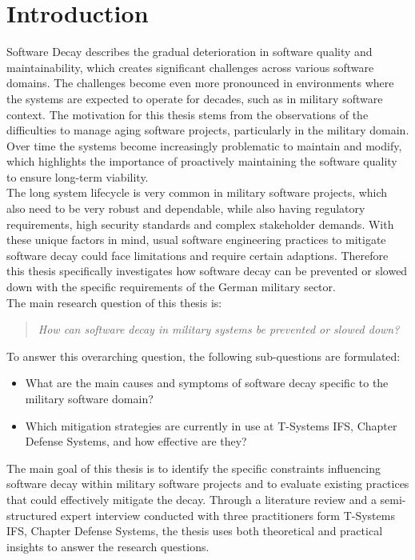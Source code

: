 \section{Introduction}
Software Decay describes the gradual deterioration in software quality and maintainability, which creates significant challenges across various software domains.
The challenges become even more pronounced in environments where the systems are expected to operate for decades, such as in military software context.
The motivation for this thesis stems from the observations of the difficulties to manage aging software projects, particularly in the military domain.
Over time the systems become increasingly problematic to maintain and modify, which highlights the importance of proactively maintaining the software quality to ensure long-term viability.\\
The long system lifecycle is very common in military software projects, which also need to be very robust and dependable, while also having regulatory requirements,
high security standards and complex stakeholder demands. With these unique factors in mind, usual software engineering practices to mitigate software decay 
could face limitations and require certain adaptions. Therefore this thesis specifically investigates how software decay can be prevented or slowed down
with the specific requirements of the German military sector.\\
The main research question of this thesis is:
\begin{quote}
    \textit{How can software decay in military systems be prevented or slowed down?}
\end{quote}
To answer this overarching question, the following sub-questions are formulated:
\begin{itemize}
    \item What are the main causes and symptoms of software decay specific to the military software domain?
    \item Which mitigation strategies are currently in use at T-Systems IFS, Chapter Defense Systems, and how effective are they?
\end{itemize}
The main goal of this thesis is to identify the specific constraints influencing software decay within military software projects and to evaluate existing practices that could effectively mitigate the decay.
Through a literature review and a semi-structured expert interview conducted with three practitioners form T-Systems IFS, Chapter Defense Systems, the thesis uses both theoretical and practical insights to answer the research questions.\\

